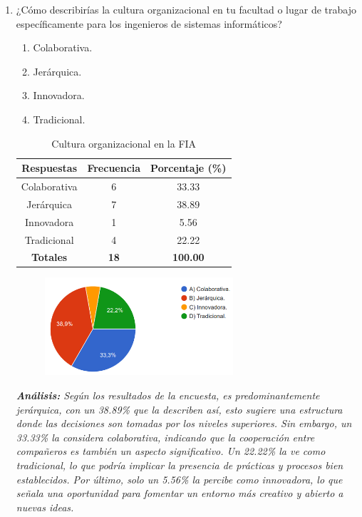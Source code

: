 \documentclass[journal]{IEEEtran}
\begin{document}
\begin{enumerate}
	\item ¿Cómo describirías la cultura organizacional en tu facultad o lugar de trabajo específicamente para los ingenieros de sistemas informáticos?
	\begin{enumerate}
		\item Colaborativa.
		\item Jerárquica.
		\item Innovadora.
		\item Tradicional.
	\end{enumerate}
	\begin{table}[H]
		\renewcommand{\arraystretch}{1.3}
		\centering
		\caption{Cultura organizacional en la FIA}
		\begin{tabular}{c c c}
			\hline
			\textbf{Respuestas} & \textbf{Frecuencia} & \textbf{Porcentaje (\%)}\\
			\hline
			Colaborativa & 6 & 33.33\\
			Jerárquica & 7 & 38.89\\
			Innovadora & 1 & 5.56\\
			Tradicional & 4 & 22.22\\
			\hline
			\textbf{Totales} &\textbf{18}& \textbf{100.00}\\
			\hline
		\end{tabular}
	\end{table}
	\begin{figure}[h]
		\centering
		\includegraphics[width=07cm]{Pregunta20}
	\end{figure}
	\textit{\textbf{Análisis:} Según los resultados de la encuesta, es predominantemente jerárquica, con un 38.89\% que la describen así, esto sugiere una estructura donde las decisiones son tomadas por los niveles superiores. Sin embargo, un 33.33\% la considera colaborativa, indicando que la cooperación entre compañeros es también un aspecto significativo. Un 22.22\% la ve como tradicional, lo que podría implicar la presencia de prácticas y procesos bien establecidos. Por último, solo un 5.56\% la percibe como innovadora, lo que señala una oportunidad para fomentar un entorno más creativo y abierto a nuevas ideas.}\\
	

\end{enumerate}
\end{document}
